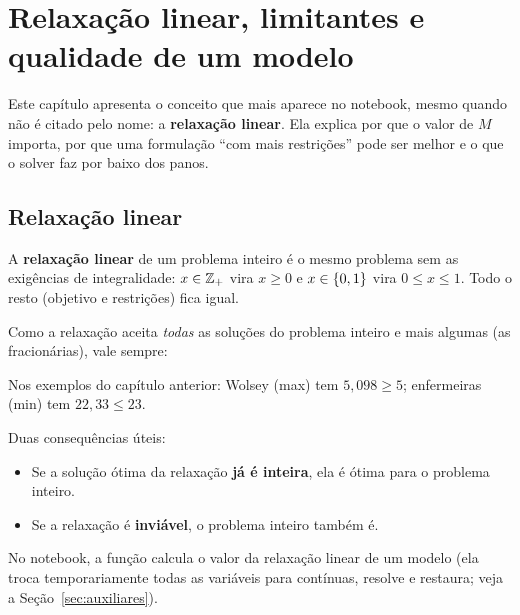 \chapter{Relaxação linear, limitantes e qualidade de um modelo}
\label{cap:relaxacao}

Este capítulo apresenta o conceito que mais aparece no notebook, mesmo quando não é citado pelo nome: a
\textbf{relaxação linear}. Ela explica por que o valor de $M$ importa, por que uma formulação ``com mais
restrições'' pode ser melhor e o que o solver faz por baixo dos panos.

\section{Relaxação linear}

\begin{definicao}
A \textbf{relaxação linear} de um problema inteiro é o mesmo problema sem as exigências de integralidade:
$x\in\mathbb{Z}_+$ vira $x\ge 0$ e $x\in\{0,1\}$ vira $0\le x\le 1$. Todo o resto (objetivo e restrições) fica igual.
\end{definicao}

Como a relaxação aceita \emph{todas} as soluções do problema inteiro e mais algumas (as fracionárias), vale sempre:
\begin{center}
\end{center}
Nos exemplos do capítulo anterior: Wolsey (max) tem $5{,}098 \ge 5$; enfermeiras (min) tem $22{,}33\le 23$.

Duas consequências úteis:
\begin{itemize}
  \item Se a solução ótima da relaxação \textbf{já é inteira}, ela é ótima para o problema inteiro.
  \item Se a relaxação é \textbf{inviável}, o problema inteiro também é.
\end{itemize}

No notebook, a função  calcula o valor da relaxação linear de um modelo (ela troca
temporariamente todas as variáveis para contínuas, resolve e restaura; veja a Seção~\ref{sec:auxiliares}).

